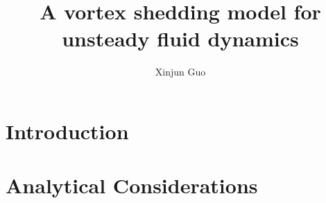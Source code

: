 \documentclass[12pt]{report}   %
\title{
A vortex shedding model for unsteady fluid dynamics
}
\author{Xinjun Guo}
\begin{document}
\doublespacing
\begin{preliminaries}
\maketitle

\copyrightpage

\begin{signature}
\end{signature}

\begin{vita}
  
\end{vita}

\begin{acknowledgments}
  
\end{acknowledgments}

\begin{abstract}
  
  \thispagestyle{empty}
\end{abstract}

\begin{spacing}{1}
  \tableofcontents
  \clearpage{\pagestyle{empty}\cleardoublepage}

  \footnotesize
  \fontsize{11.5pt}{12.5pt}\selectfont
  \listoftables
  \clearpage{\pagestyle{empty}\cleardoublepage}

  \listoffigures
  \clearpage{\pagestyle{empty}\cleardoublepage}
  \normalsize
\end{spacing}

\end{preliminaries}

\pagestyle{myheadings}


\chapter{Introduction}

\clearpage{\pagestyle{empty}\cleardoublepage}

\chapter{Analytical Considerations}

\clearpage{\pagestyle{empty}\cleardoublepage}
\end{document}
